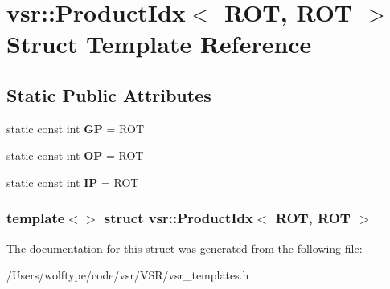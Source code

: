 \hypertarget{structvsr_1_1_product_idx_3_01_r_o_t_00_01_r_o_t_01_4}{\section{vsr\-:\-:Product\-Idx$<$ R\-O\-T, R\-O\-T $>$ Struct Template Reference}
\label{structvsr_1_1_product_idx_3_01_r_o_t_00_01_r_o_t_01_4}
}
\subsection*{Static Public Attributes}
\begin{DoxyCompactItemize}
\item 
\hypertarget{structvsr_1_1_product_idx_3_01_r_o_t_00_01_r_o_t_01_4_a2f6ba5994054bea0fc24f1bd092c239f}{static const int {\bfseries G\-P} = R\-O\-T}\label{structvsr_1_1_product_idx_3_01_r_o_t_00_01_r_o_t_01_4_a2f6ba5994054bea0fc24f1bd092c239f}

\item 
\hypertarget{structvsr_1_1_product_idx_3_01_r_o_t_00_01_r_o_t_01_4_afeaeab8343d45890d014bc6db38ae474}{static const int {\bfseries O\-P} = R\-O\-T}\label{structvsr_1_1_product_idx_3_01_r_o_t_00_01_r_o_t_01_4_afeaeab8343d45890d014bc6db38ae474}

\item 
\hypertarget{structvsr_1_1_product_idx_3_01_r_o_t_00_01_r_o_t_01_4_a9a8a64ca50d86ff5e87f199f5eb4db76}{static const int {\bfseries I\-P} = R\-O\-T}\label{structvsr_1_1_product_idx_3_01_r_o_t_00_01_r_o_t_01_4_a9a8a64ca50d86ff5e87f199f5eb4db76}

\end{DoxyCompactItemize}
\subsubsection*{template$<$$>$ struct vsr\-::\-Product\-Idx$<$ R\-O\-T, R\-O\-T $>$}



The documentation for this struct was generated from the following file\-:\begin{DoxyCompactItemize}
\item 
/\-Users/wolftype/code/vsr/\-V\-S\-R/vsr\-\_\-templates.\-h\end{DoxyCompactItemize}
